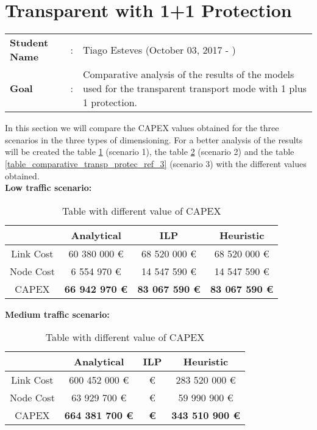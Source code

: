 \clearpage

\section{Transparent with 1+1 Protection}\label{comparative_Transp_Protection}
\begin{tcolorbox}	
\begin{tabular}{p{2.75cm} p{0.2cm} p{10.5cm}} 	
\textbf{Student Name}  &:& Tiago Esteves    (October 03, 2017 - )\\
\textbf{Goal}          &:& Comparative analysis of the results of the models used for the transparent transport mode with 1 plus 1 protection.
\end{tabular}
\end{tcolorbox}
\vspace{11pt}


In this section we will compare the CAPEX values obtained for the three scenarios in the three types of dimensioning. For a better analysis of the results will be created the table \ref{table_comparative_transp_protec_ref_1} (scenario 1), the table \ref{table_comparative_transp_protec_ref_2} (scenario 2) and the table \ref{table_comparative_transp_protec_ref_3} (scenario 3) with the different values obtained.\\

\textbf{Low traffic scenario:}

\begin{table}[h!]
\centering
\begin{tabular}{| c | c | c | c |}
 \hline
   & Analytical & ILP & Heuristic \\
 \hline\hline
 Link Cost & 60 380 000 \euro & 68 520 000 \euro & 68 520 000 \euro \\
 Node Cost & 6 554 970 \euro & 14 547 590 \euro & 14 547 590 \euro \\
 CAPEX & \textbf{66 942 970 \euro} & \textbf{83 067 590 \euro} & \textbf{83 067 590 \euro} \\
 \hline
\end{tabular}
\caption{Table with different value of CAPEX }
\label{table_comparative_transp_protec_ref_1}
\end{table}


\vspace{11pt}
\textbf{Medium traffic scenario:}

\begin{table}[h!]
\centering
\begin{tabular}{| c | c | c | c |}
 \hline
   & Analytical & ILP & Heuristic \\
 \hline\hline
 Link Cost & 600 452 000 \euro &  \euro & 283 520 000 \euro \\
 Node Cost & 63 929 700 \euro &  \euro & 59 990 900 \euro \\
 CAPEX & \textbf{664 381 700 \euro} & \textbf{ \euro} & \textbf{343 510 900 \euro} \\
 \hline
\end{tabular}
\caption{Table with different value of CAPEX }
\label{table_comparative_transp_protec_ref_2}
\end{table}


